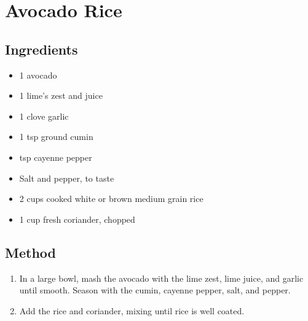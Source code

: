 \section{Avocado Rice}
\begin{multicols}{2}
  \subsection{Ingredients}
    \begin{itemize}
      \item 1 avocado
      \item 1 lime's zest and juice
      \item 1 clove garlic
      \item 1 tsp ground cumin
      \item {} tsp cayenne pepper
      \item Salt and pepper, to taste
      \item 2 cups cooked white or brown medium grain rice
      \item 1 cup fresh coriander, chopped
    \end{itemize}
  \vfill\null
  \columnbreak
  \subsection{Method}
    \begin{enumerate}
      \item In a large bowl, mash the avocado with the lime zest, lime juice, and garlic until smooth. Season with the cumin, cayenne pepper, salt, and pepper.
      \item Add the rice and coriander, mixing until rice is well coated.
    \end{enumerate}
  \end{multicols}
